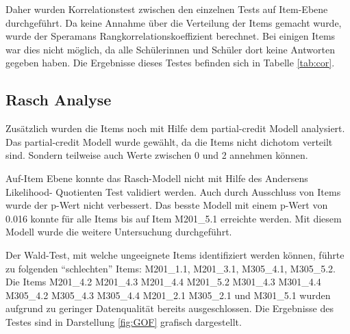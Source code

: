Daher wurden Korrelationstest zwischen den einzelnen Tests auf Item-Ebene durchgeführt. Da keine Annahme über die Verteilung der Items gemacht wurde, wurde der Speramans Rangkorrelationskoeffizient berechnet. Bei einigen Items war dies nicht möglich, da alle Schülerinnen und Schüler dort keine Antworten gegeben haben. Die Ergebnisse dieses Testes befinden sich in Tabelle \ref{tab:cor}.



\subsection{Rasch Analyse}

Zusätzlich wurden die Items noch mit Hilfe dem partial-credit Modell analysiert. Das partial-credit Modell wurde gewählt, da die Items nicht dichotom verteilt sind. Sondern teilweise auch Werte zwischen 0 und 2 annehmen können.

Auf-Item Ebene konnte das Rasch-Modell nicht mit Hilfe des Andersens Likelihood-
Quotienten Test validiert werden. Auch durch Ausschluss von Items wurde der p-Wert nicht verbessert. Das besste Modell mit einem p-Wert von 0.016 konnte für alle Items bis auf Item M201\_5.1 erreichte werden. Mit diesem Modell wurde die weitere Untersuchung durchgeführt.

Der Wald-Test, mit welche ungeeignete Items identifiziert werden können, führte zu folgenden "`schlechten"' Items: M201\_1.1, M201\_3.1, M305\_4.1, M305\_5.2.
Die Items M201\_4.2 M201\_4.3 M201\_4.4 M201\_5.2 M301\_4.3 M301\_4.4 M305\_4.2 M305\_4.3 M305\_4.4 M201\_2.1 M305\_2.1 und M301\_5.1 wurden aufgrund zu geringer Datenqualität bereits ausgeschlossen. Die Ergebnisse des Testes sind in Darstellung \ref{fig:GOF} grafisch dargestellt.

